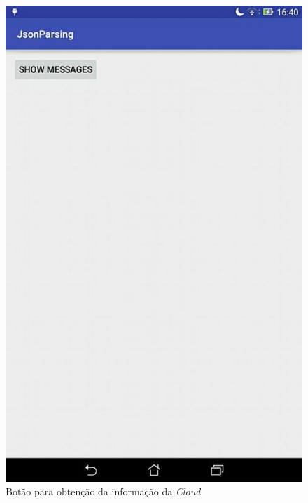 \documentclass[a4paper]{article}
\begin{document}
\begin{figure}[H]
  \includegraphics[width=\linewidth]{get.jpg}
  \caption{Botão para obtenção da informação da \textit{Cloud}}\label{fig:get}
\endminipage\hfill
{}

\end{figure}
\end{document}
